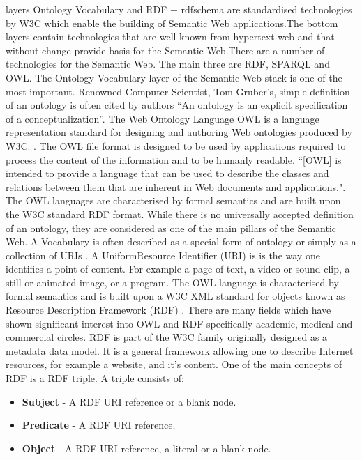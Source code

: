 layers Ontology Vocabulary and RDF + rdfschema are standardised technologies by W3C which enable the building of Semantic Web applications.The bottom layers contain technologies that are well known from hypertext web and that without change provide basis for the Semantic Web.There are a number of technologies for the Semantic Web. The main three are RDF, SPARQL and OWL. The Ontology Vocabulary layer of the Semantic Web stack is one of the most important. Renowned Computer Scientist, Tom Gruber's, simple definition of an ontology is often cited by authors ``An ontology is an explicit specification of a conceptualization''. The Web Ontology Language OWL is a language representation standard for designing and authoring Web ontologies produced by W3C. \cite{owl}. The OWL file format is designed to be used by applications required to process the content of the information and to be humanly readable. ``[OWL] is intended to provide a language that can be used to describe the classes and relations between them that are inherent in Web documents and applications."\cite{owl}. The OWL languages are characterised by formal semantics and are built upon the W3C standard RDF format. While there is no universally accepted definition of an ontology, they are considered as one of the main pillars of the Semantic Web. A Vocabulary is often described as a special form of ontology or simply as a collection of URIs \cite{sm2}. A UniformResource Identifier (URI) is is the way one identifies a point of content. For example a page of text, a video or sound clip, a still or animated image, or a program. The OWL language is characterised by formal semantics and is built upon a W3C XML standard for objects known as Resource Description Framework (RDF) \cite{sm4}. There are many fields which have shown significant interest into OWL and RDF specifically academic, medical and commercial circles. RDF is part of the W3C family originally designed as a metadata data model. It is a general framework allowing one to describe Internet resources, for example a website, and it's content. One of the main concepts of RDF is a RDF triple. A triple consists of:

\begin{itemize}
\item \textbf{Subject} - A RDF URI reference or a blank node.
\item \textbf{Predicate} - A RDF URI reference.
\item \textbf{Object} - A RDF URI reference, a literal or a blank node.
\end{itemize}

